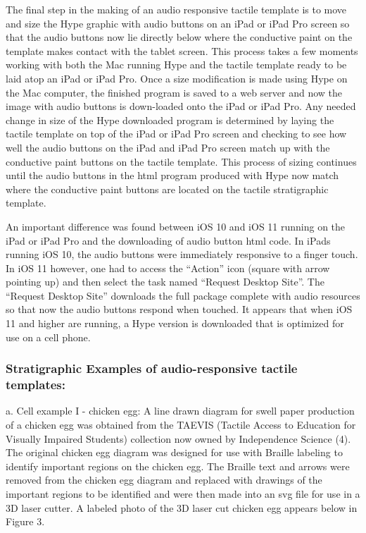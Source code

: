\documentclass[11.5pt]{sig-alternate} %
\begin{document}
\begin{large}
The final step in the making of an audio responsive tactile template is to move and size the Hype graphic with audio buttons on an iPad or iPad Pro screen so that the audio buttons now lie directly below where the conductive paint on the template makes contact with the tablet screen.  This process takes a few moments working with both the Mac running Hype and the tactile template ready to be laid atop an iPad or iPad Pro.  Once a size modification is made using Hype on the Mac computer, the finished program is saved to a web server and now the image with audio buttons is down-loaded onto the iPad or iPad Pro.  Any needed change in size of the Hype downloaded program is determined by laying the tactile template on top of the iPad or iPad Pro screen and checking to see how well the audio buttons on the iPad and iPad Pro screen match up with the conductive paint buttons on the tactile template.  This process of sizing continues until the audio buttons in the html program produced with Hype now match where the conductive paint buttons are located on the tactile stratigraphic template.

An important difference was found between iOS 10 and iOS 11 running on the iPad or iPad Pro and the downloading of audio button html code.  In iPads running iOS 10, the audio buttons were immediately responsive to a finger touch.  In iOS 11 however, one had to access the “Action” icon (square with arrow pointing up) and then select the task named “Request Desktop Site”.  The “Request Desktop Site” downloads the full package complete with audio resources so that now the audio buttons respond when touched.  It appears that when iOS 11 and higher are running, a Hype version is downloaded that is optimized for use on a cell phone.
      
\subsubsection*{Stratigraphic Examples of audio-responsive tactile templates:}

a. Cell example I - chicken egg:  A line drawn diagram for swell paper production of a chicken egg was obtained from the TAEVIS (Tactile Access to Education for Visually Impaired Students) collection now owned by Independence Science (4).  The original chicken egg diagram was designed for use with Braille labeling to identify important regions on the chicken egg.  The Braille text and arrows were removed from the chicken egg diagram and replaced with drawings of the important regions to be identified and were then made into an svg file for use in a 3D laser cutter.  A labeled photo of the 3D laser cut chicken egg appears below in Figure 3.


\end{large}
\end{document}
